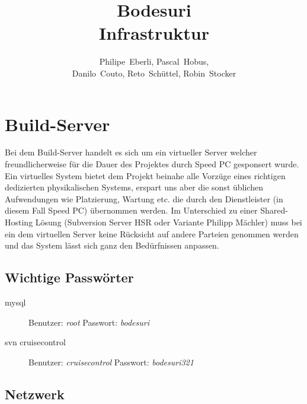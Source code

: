 \documentclass[a4paper,12pt,halfparskip,DIV14]{scrreprt}
\begin{document}
\title{Bodesuri\\Infrastruktur}
\subject{Infastruktur-Dokumentation}
\author{Philipe~Eberli, Pascal~Hobus, \\ Danilo~Couto, Reto~Schüttel, Robin~Stocker}
\maketitle


\tableofcontents
\thispagestyle{plain}
\newpage


\chapter{Build-Server} %
\label{cha:build_server}

Bei dem Build-Server handelt es sich um ein virtueller Server welcher freundlicherweise für die Dauer des Projektes durch Speed PC gesponsert wurde. Ein virtuelles System bietet dem Projekt beinahe alle Vorzüge eines richtigen dedizierten physikalischen Systems, erspart uns aber die sonst üblichen Aufwendungen wie Platzierung, Wartung etc. die durch den Dienstleister (in diesem Fall Speed PC) übernommen werden. Im Unterschied zu einer Shared-Hosting Lösung (Subversion Server HSR oder Variante Philipp Mächler) muss bei ein dem virtuellen Server keine Rücksicht auf andere Parteien genommen werden und das System lässt sich ganz den Bedürfnissen anpassen.


\section{Wichtige Passwörter} %
\label{sec:wichtige_passwörter}

\begin{description}
  \item[mysql] Benutzer: \emph{root} Passwort: \emph{bodesuri}
  \item[svn cruisecontrol] Benutzer: \emph{cruisecontrol} Passwort: \emph{bodesuri321}
\end{description}


\section{Netzwerk} %
\label{sec:netzwerk}
\end{document}
